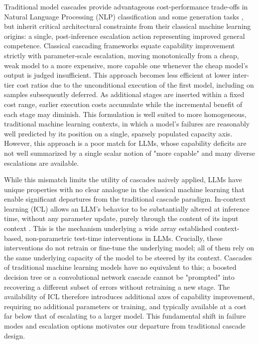 \documentclass[sigconf]{acmart}
\begin{document}
Traditional model cascades provide advantageous cost-performance trade-offs in Natural Language Processing (NLP) classification and some generation tasks \cite{varshney-baral-2022-model, Gupta2024}, but inherit critical architectural constraints from their classical machine learning origins: a single, post-inference escalation action representing improved general competence. Classical cascading frameworks equate capability improvement strictly with parameter-scale escalation, moving monotonically from a cheap, weak model to a more expensive, more capable one whenever the cheap model's output is judged insufficient. This approach becomes less efficient at lower inter-tier cost ratios due to the unconditional execution of the first model, including on samples subsequently deferred. As additional stages are inserted within a fixed cost range, earlier execution costs accumulate while the incremental benefit of each stage may diminish. This formulation is well suited to more homogeneous, traditional machine learning contexts, in which a model's failures are reasonably well predicted by its position on a single, sparsely populated capacity axis. However, this approach is a poor match for LLMs, whose capability deficits are not well summarized by a single scalar notion of "more capable" and many diverse escalations are available.
 
While this mismatch limits the utility of cascades naively applied, LLMs have unique properties with no clear analogue in the classical machine learning that enable significant departures from the traditional cascade paradigm. In-context learning (ICL) allows an LLM's behavior to be substantially altered at inference time, without any parameter update, purely through the content of its input context \cite{icl}. This is the mechanism underlying a wide array established context-based, non-parametric test-time interventions in LLMs. Crucially, these interventions do not retrain or fine-tune the underlying model; all of them rely on the same underlying capacity of the model to be steered by its context. Cascades of traditional machine learning models have no equivalent to this; a boosted decision tree or a convolutional network cascade cannot be "prompted" into recovering a different subset of errors without retraining a new stage. The availability of ICL therefore introduces additional axes of capability improvement, requiring no additional parameters or training, and typically available at a cost far below that of escalating to a larger model. This fundamental shift in failure modes and escalation options motivates our departure from traditional cascade design.
 
\end{document}
